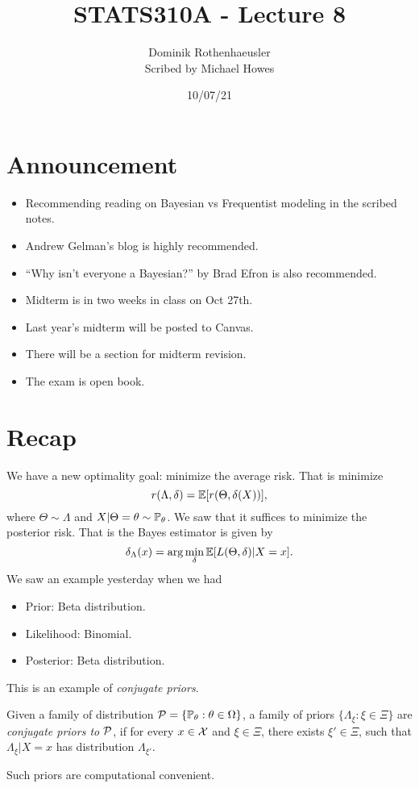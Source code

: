 




\title{STATS310A - Lecture 8}
\author{Dominik Rothenhaeusler\\ Scribed by Michael Howes}
\date{10/07/21}

\pagestyle{fancy}
\fancyhf{}


\maketitle
\tableofcontents
\section{Announcement}
\begin{itemize}
    \item Recommending reading on Bayesian vs Frequentist modeling in the scribed notes. 
    \item Andrew Gelman's blog is highly recommended.
    \item ``Why isn't everyone a Bayesian?'' by Brad Efron is also recommended.
    \item Midterm is in two weeks in class on Oct 27th.
    \item Last year's midterm will be posted to Canvas.
    \item There will be a section for midterm revision.
    \item The exam is open book.
\end{itemize}
\section{Recap}
We have a new optimality goal: minimize the average risk. That is minimize
\[r(\Lambda, \delta)= {\mathbb{E}}[r(\Theta, \delta(X))], \]
where $\Theta \sim \Lambda$ and $X |\Theta = {\theta} \sim {\mathbb{P}}_{\theta}$. We saw that it suffices to minimize the posterior risk. That is the Bayes estimator is given by 
\[\delta_\Lambda(x) = \arg\min_\delta {\mathbb{E}}[L(\Theta, \delta)|X=x]. \]
We saw an example yesterday when we had 
\begin{itemize}
    \item Prior: Beta distribution.
    \item Likelihood: Binomial.
    \item Posterior: Beta distribution.
\end{itemize}
This is an example of \emph{conjugate priors}. 
\begin{defn}
    Given a family of distribution ${\mathcal{P}} = \{{\mathbb{P}}_{\theta} :{\theta} \in {{\Omega}}\}$, a family of priors $\{\Lambda_\xi : \xi \in \Xi\}$ are \emph{conjugate priors to } ${\mathcal{P}}$, if for every  $x \in {\mathcal{X}}$ and $\xi \in \Xi$, there exists $\xi' \in \Xi$, such that $\Lambda_\xi | X=x $ has distribution $\Lambda_{\xi'}$.
\end{defn}
Such priors are computational convenient.

